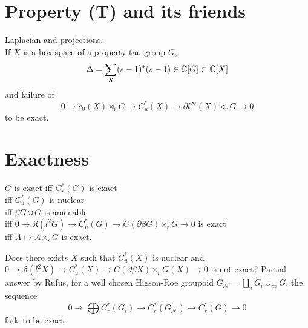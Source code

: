 \section{Property (T) and its friends}

Laplacian and projections.\\
If $X$ is a box space of a property tau group $G$,
\[\Delta = \sum_S (s-1)^*(s-1) \in \mathbb C [G] \subset \mathbb C[X]\]
and failure of 
\[ 0 \rightarrow c_0(X)\rtimes_r G \rightarrow C^*_u(X) \rightarrow \partial l^\infty (X)\rtimes_r G \rightarrow 0\]
to be exact.

\section{Exactness}
\begin{thm}
$G$ is exact iff $C^*_r(G)$ is exact \\
iff $C^*_u(G)$ is nuclear \\
iff $\beta G \rtimes G$ is amenable \\
iff $0\rightarrow \mathfrak K(l^2G) \rightarrow C^*_u(G) \rightarrow C(\partial \beta G )\rtimes_r G \rightarrow  0 $ is exact \\
iff $A\mapsto A\rtimes_r G$ is exact.\\
\end{thm}
Does there exists $X$ such that $C^*_u(X)$ is nuclear and $0\rightarrow \mathfrak K(l^2X) \rightarrow C^*_u(X) \rightarrow C(\partial \beta X )\rtimes_r G(X) \rightarrow  0 $ is not exact? Partial answer by Rufus, for a well chosen Higson-Roe groupoid $G_{\mathcal N} = \coprod_i G_i \cup_{\infty} G$, the sequence 
\[0\rightarrow \mathfrak \bigoplus C^*_r(G_i) \rightarrow C^*_r(G_{\mathcal N}) \rightarrow C^*_r (G) \rightarrow  0 \]
fails to be exact.
